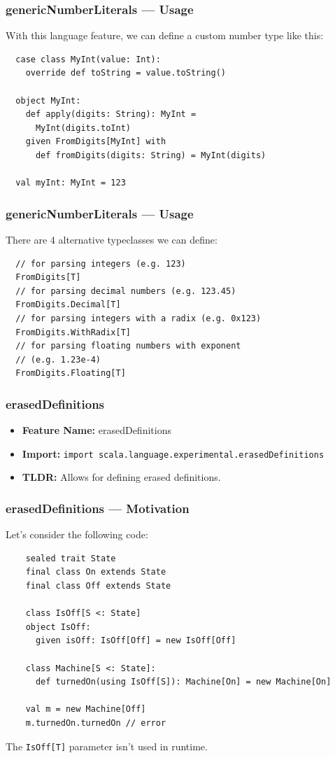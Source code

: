 \documentclass{beamer}
\begin{document}
\begin{frame}[fragile]
  \frametitle{genericNumberLiterals --- Usage}

  With this language feature, we can define a custom number type like this:

  \begin{lstlisting}
  case class MyInt(value: Int):
    override def toString = value.toString()
  
  object MyInt:
    def apply(digits: String): MyInt =
      MyInt(digits.toInt)
    given FromDigits[MyInt] with
      def fromDigits(digits: String) = MyInt(digits)

  val myInt: MyInt = 123
  \end{lstlisting}
  
\end{frame}

\begin{frame}[fragile]
  \frametitle{genericNumberLiterals --- Usage}

  There are 4 alternative typeclasses we can define:

  \begin{lstlisting}
  // for parsing integers (e.g. 123)
  FromDigits[T]
  // for parsing decimal numbers (e.g. 123.45)
  FromDigits.Decimal[T]
  // for parsing integers with a radix (e.g. 0x123)
  FromDigits.WithRadix[T]
  // for parsing floating numbers with exponent
  // (e.g. 1.23e-4)
  FromDigits.Floating[T]
  \end{lstlisting}

\end{frame}

\begin{frame}[fragile]
  \frametitle{erasedDefinitions}
  \begin{itemize}
    \item \textbf{Feature Name:} erasedDefinitions
    \item \textbf{Import:} \texttt{import scala.language.experimental.erasedDefinitions}
    \item \textbf{TLDR:} Allows for defining erased definitions.
  \end{itemize}
\end{frame}

\begin{frame}[fragile]
  \frametitle{erasedDefinitions --- Motivation}

  Let's consider the following code:

  \begin{lstlisting}
    sealed trait State
    final class On extends State
    final class Off extends State
    
    class IsOff[S <: State]
    object IsOff:
      given isOff: IsOff[Off] = new IsOff[Off]
    
    class Machine[S <: State]:
      def turnedOn(using IsOff[S]): Machine[On] = new Machine[On]
    
    val m = new Machine[Off]
    m.turnedOn.turnedOn // error
  \end{lstlisting}

  The \texttt{IsOff[T]} parameter isn't used in runtime.
  
\end{frame}
\end{document}
